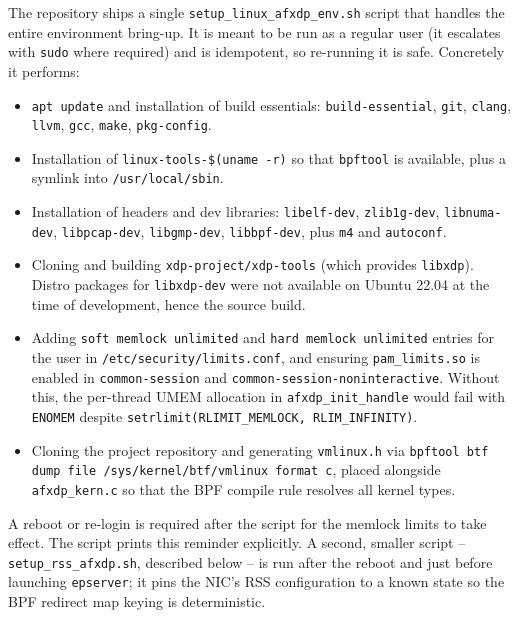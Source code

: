 \documentclass[10pt, letterpaper, twocolumn]{article}
\begin{document}
The repository ships a single \texttt{setup\_linux\_afxdp\_env.sh} script that handles the entire environment bring-up. It is meant to be run as a regular user (it escalates with \texttt{sudo} where required) and is idempotent, so re-running it is safe. Concretely it performs:
\begin{itemize}
    \item \texttt{apt update} and installation of build essentials: \texttt{build-essential}, \texttt{git}, \texttt{clang}, \texttt{llvm}, \texttt{gcc}, \texttt{make}, \texttt{pkg-config}.
    \item Installation of \texttt{linux-tools-\$(uname -r)} so that \texttt{bpftool} is available, plus a symlink into \texttt{/usr/local/sbin}.
    \item Installation of headers and dev libraries: \texttt{libelf-dev}, \texttt{zlib1g-dev}, \texttt{libnuma-dev}, \texttt{libpcap-dev}, \texttt{libgmp-dev}, \texttt{libbpf-dev}, plus \texttt{m4} and \texttt{autoconf}.
    \item Cloning and building \texttt{xdp-project/xdp-tools} (which provides \texttt{libxdp}). Distro packages for \texttt{libxdp-dev} were not available on Ubuntu 22.04 at the time of development, hence the source build.
    \item Adding \texttt{soft memlock unlimited} and \texttt{hard memlock unlimited} entries for the user in \texttt{/etc/security/limits.conf}, and ensuring \texttt{pam\_limits.so} is enabled in \texttt{common-session} and \texttt{common-session-noninteractive}. Without this, the per-thread UMEM allocation in \texttt{afxdp\_init\_handle} would fail with \texttt{ENOMEM} despite \texttt{setrlimit(RLIMIT\_MEMLOCK, RLIM\_INFINITY)}.
    \item Cloning the project repository and generating \texttt{vmlinux.h} via \texttt{bpftool btf dump file /sys/kernel/btf/vmlinux format c}, placed alongside \texttt{afxdp\_kern.c} so that the BPF compile rule resolves all kernel types.
\end{itemize}
A reboot or re-login is required after the script for the memlock limits to take effect. The script prints this reminder explicitly. A second, smaller script -- \texttt{setup\_rss\_afxdp.sh}, described below -- is run after the reboot and just before launching \texttt{epserver}; it pins the NIC's RSS configuration to a known state so the BPF redirect map keying is deterministic.
\end{document}
